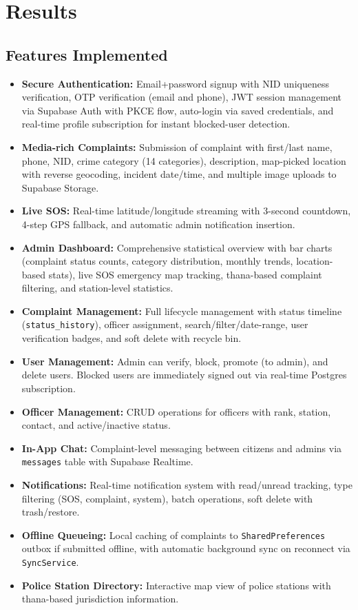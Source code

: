 \documentclass[11pt, a4paper]{report}
\begin{document}
\chapter{Results}

\section{Features Implemented}
\begin{itemize}
    \item \textbf{Secure Authentication:} Email+password signup with NID uniqueness verification, OTP verification (email and phone), JWT session management via Supabase Auth with PKCE flow, auto-login via saved credentials, and real-time profile subscription for instant blocked-user detection.
    \item \textbf{Media-rich Complaints:} Submission of complaint with first/last name, phone, NID, crime category (14 categories), description, map-picked location with reverse geocoding, incident date/time, and multiple image uploads to Supabase Storage.
    \item \textbf{Live SOS:} Real-time latitude/longitude streaming with 3-second countdown, 4-step GPS fallback, and automatic admin notification insertion.
    \item \textbf{Admin Dashboard:} Comprehensive statistical overview with bar charts (complaint status counts, category distribution, monthly trends, location-based stats), live SOS emergency map tracking, thana-based complaint filtering, and station-level statistics.
    \item \textbf{Complaint Management:} Full lifecycle management with status timeline (\texttt{status\_history}), officer assignment, search/filter/date-range, user verification badges, and soft delete with recycle bin.
    \item \textbf{User Management:} Admin can verify, block, promote (to admin), and delete users. Blocked users are immediately signed out via real-time Postgres subscription.
    \item \textbf{Officer Management:} CRUD operations for officers with rank, station, contact, and active/inactive status.
    \item \textbf{In-App Chat:} Complaint-level messaging between citizens and admins via \texttt{messages} table with Supabase Realtime.
    \item \textbf{Notifications:} Real-time notification system with read/unread tracking, type filtering (SOS, complaint, system), batch operations, soft delete with trash/restore.
    \item \textbf{Offline Queueing:} Local caching of complaints to \texttt{SharedPreferences} outbox if submitted offline, with automatic background sync on reconnect via \texttt{SyncService}.
    \item \textbf{Police Station Directory:} Interactive map view of police stations with thana-based jurisdiction information.
\end{itemize}
\end{document}
